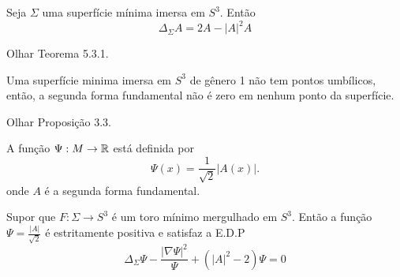\begin{teorema}\label{Simon's_identity}
	Seja $\Sigma$ uma superfície mínima imersa em $S^3$. Então
	\begin{equation*}
		\Delta_{\Sigma} A = 2 A - |A|^2 A
	\end{equation*} 
\end{teorema}

\begin{demonstracao}
	Olhar \cite{Simons1968} Teorema 5.3.1.
\end{demonstracao}

\begin{teorema}\label{nao_existem_pontos_umbilicos}
	Uma superfície minima imersa em $S^3$ de gênero 1 não tem pontos umbílicos, então, a segunda forma fundamental não é zero em nenhum ponto da superfície.
\end{teorema}

\begin{demonstracao}
	Olhar \cite{Brendle2013} Proposição 3.3.
\end{demonstracao}

\begin{definicao}
	A função $\Psi: M \rightarrow \mathbb{R}$ está definida por
	\begin{equation*}
	\Psi(x) = \frac{1}{\sqrt{2}} |A(x)|.
	\end{equation*}
	onde $A$ é a segunda forma fundamental.
\end{definicao}

\begin{proposicao}\label{edp_principal}
	Supor que $F: \Sigma \rightarrow S^3$ é um toro mínimo mergulhado em $S^3$. Então a função $\Psi = \frac{|A|}{\sqrt{2}}$ é estritamente positiva e satisfaz a E.D.P
	\begin{equation*}
		\Delta_\Sigma \Psi - \frac{|\nabla \Psi|^2}{\Psi} + (|A|^2 - 2) \Psi = 0
	\end{equation*}
\end{proposicao}

